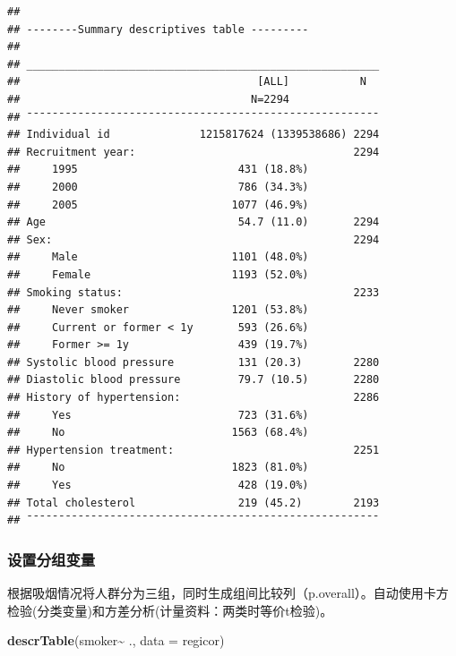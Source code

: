 \documentclass[
]{article}
\newenvironment{Shaded}{\begin{snugshade}}{\end{snugshade}}
\newcommand{\AttributeTok}[1]{\textcolor[rgb]{0.13,0.29,0.53}{#1}}
\newcommand{\FunctionTok}[1]{\textcolor[rgb]{0.13,0.29,0.53}{\textbf{#1}}}
\newcommand{\NormalTok}[1]{#1}
\newcommand{\SpecialCharTok}[1]{\textcolor[rgb]{0.81,0.36,0.00}{\textbf{#1}}}
\newcommand{\StringTok}[1]{\textcolor[rgb]{0.31,0.60,0.02}{#1}}
\begin{document}
\begin{verbatim}
## 
## --------Summary descriptives table ---------
## 
## _______________________________________________________ 
##                                     [ALL]           N   
##                                    N=2294               
## ¯¯¯¯¯¯¯¯¯¯¯¯¯¯¯¯¯¯¯¯¯¯¯¯¯¯¯¯¯¯¯¯¯¯¯¯¯¯¯¯¯¯¯¯¯¯¯¯¯¯¯¯¯¯¯ 
## Individual id              1215817624 (1339538686) 2294 
## Recruitment year:                                  2294 
##     1995                         431 (18.8%)            
##     2000                         786 (34.3%)            
##     2005                        1077 (46.9%)            
## Age                              54.7 (11.0)       2294 
## Sex:                                               2294 
##     Male                        1101 (48.0%)            
##     Female                      1193 (52.0%)            
## Smoking status:                                    2233 
##     Never smoker                1201 (53.8%)            
##     Current or former < 1y       593 (26.6%)            
##     Former >= 1y                 439 (19.7%)            
## Systolic blood pressure          131 (20.3)        2280 
## Diastolic blood pressure         79.7 (10.5)       2280 
## History of hypertension:                           2286 
##     Yes                          723 (31.6%)            
##     No                          1563 (68.4%)            
## Hypertension treatment:                            2251 
##     No                          1823 (81.0%)            
##     Yes                          428 (19.0%)            
## Total cholesterol                219 (45.2)        2193 
## ¯¯¯¯¯¯¯¯¯¯¯¯¯¯¯¯¯¯¯¯¯¯¯¯¯¯¯¯¯¯¯¯¯¯¯¯¯¯¯¯¯¯¯¯¯¯¯¯¯¯¯¯¯¯¯
\end{verbatim}

\subsubsection{\texorpdfstring{\textbf{设置分组变量}}{设置分组变量}}\label{ux8bbeux7f6eux5206ux7ec4ux53d8ux91cf}

根据吸烟情况将人群分为三组，同时生成组间比较列（p.overall）。自动使用卡方检验(分类变量)和方差分析(计量资料：两类时等价t检验)。

\begin{Shaded}
\begin{Highlighting}[]
\FunctionTok{descrTable}\NormalTok{(}\StringTok{\textasciigrave{}}\AttributeTok{smoker}\StringTok{\textasciigrave{}}\SpecialCharTok{\textasciitilde{}}\NormalTok{ ., }\AttributeTok{data =}\NormalTok{ regicor)}
\end{Highlighting}
\end{Shaded}
\end{document}
